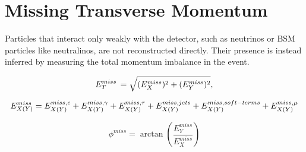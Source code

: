 \section{Missing Transverse Momentum}

Particles that interact only weakly with the detector, such as neutrinos or BSM particles like neutralinos, are not reconstructed directly. 
Their presence is instead inferred by measuring the total momentum imbalance in the event. 

\begin{equation}
E_{T}^{miss}\, = \sqrt{(E_{X}^{miss})^{2}  +  (E_{Y}^{miss})^{2}},
\end{equation}

\begin{equation}
E_{X(Y)}^{miss} = E_{X(Y)}^{miss,e} +    E_{X(Y)}^{miss,\gamma} + E_{X(Y)}^{miss,\tau}    \nonumber \\
+ E_{X(Y)}^{miss,jets} + E_{X(Y)}^{miss,soft-terms}  +  E_{X(Y)}^{miss,\mu} 
\label{eq:etm} 
\end{equation}


\begin{equation}
\phi^{miss} = \arctan \left( \frac{E_Y^{miss}}{E_X^{miss}} \right)
\end{equation}




